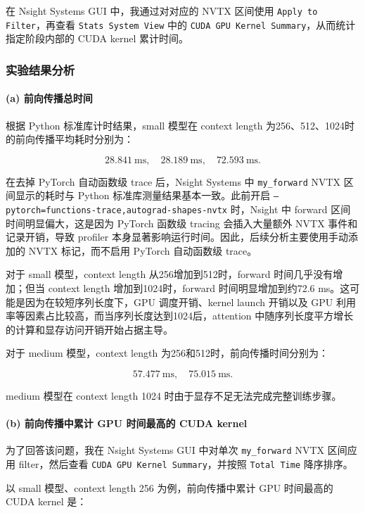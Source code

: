 \documentclass[12pt]{ctexart}
\begin{document}
在 Nsight Systems GUI 中，我通过对对应的 NVTX 区间使用 \texttt{Apply to Filter}，再查看 \texttt{Stats System View} 中的 \texttt{CUDA GPU Kernel Summary}，从而统计指定阶段内部的 CUDA kernel 累计时间。

\subsubsection{实验结果分析}

\paragraph{(a) 前向传播总时间}

根据 Python 标准库计时结果，small 模型在 context length 为256、512、1024时的前向传播平均耗时分别为：

\[
28.841\ \text{ms},\quad
28.189\ \text{ms},\quad
72.593\ \text{ms}.
\]

在去掉 PyTorch 自动函数级 trace 后，Nsight Systems 中 \texttt{my\_forward} NVTX 区间显示的耗时与 Python 标准库测量结果基本一致。此前开启 \texttt{--pytorch=functions-trace,autograd-shapes-nvtx} 时，Nsight 中 forward 区间时间明显偏大，这是因为 PyTorch 函数级 tracing 会插入大量额外 NVTX 事件和记录开销，导致 profiler 本身显著影响运行时间。因此，后续分析主要使用手动添加的 NVTX 标记，而不启用 PyTorch 自动函数级 trace。

对于 small 模型，context length 从256增加到512时，forward 时间几乎没有增加；但当 context length 增加到1024时，forward 时间明显增加到约72.6 ms。这可能是因为在较短序列长度下，GPU 调度开销、kernel launch 开销以及 GPU 利用率等因素占比较高，而当序列长度达到1024后，attention 中随序列长度平方增长的计算和显存访问开销开始占据主导。

对于 medium 模型，context length 为256和512时，前向传播时间分别为：

\[
57.477\ \text{ms},\quad
75.015\ \text{ms}.
\]

medium 模型在 context length 1024 时由于显存不足无法完成完整训练步骤。

\paragraph{(b) 前向传播中累计 GPU 时间最高的 CUDA kernel}

为了回答该问题，我在 Nsight Systems GUI 中对单次 \texttt{my\_forward} NVTX 区间应用 filter，然后查看 \texttt{CUDA GPU Kernel Summary}，并按照 \texttt{Total Time} 降序排序。

以 small 模型、context length 256 为例，前向传播中累计 GPU 时间最高的 CUDA kernel 是：
\end{document}
